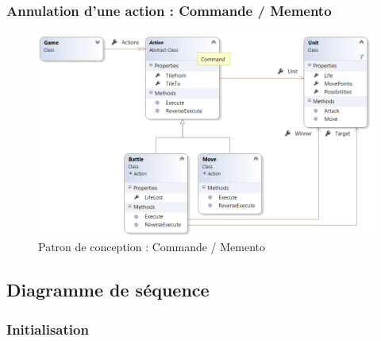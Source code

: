 \subsubsection{Annulation d'une action : Commande / Memento}
\begin{figure}[h]
  \centering
  \includegraphics[width=13cm]{schemas/dp_command.png}
  \caption{Patron de conception : Commande / Memento}
  \label{fig:command}
\end{figure}

\subsection{Diagramme de séquence}
\label{diagSequence}
\subsubsection{Initialisation}


